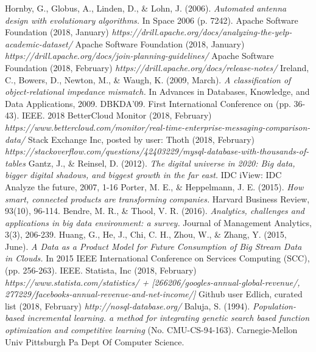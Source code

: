 \documentclass[a4paper,english]{report}
\begin{document}
\begin{thebibliography}{1}
		Hornby, G., Globus, A., Linden, D., \& Lohn, J. (2006). \emph{Automated antenna design with evolutionary algorithms.} In Space 2006 (p. 7242).
		Apache Software Foundation (2018, January) \emph{https://drill.apache.org/docs/analyzing-the-yelp-academic-dataset/}
		Apache Software Foundation (2018, January)
		\emph{https://drill.apache.org/docs/join-planning-guidelines/}
		Apache Software Foundation (2018, February) 	\emph{https://drill.apache.org/docs/release-notes/}
		Ireland, C., Bowers, D., Newton, M., \& Waugh, K. (2009, March). \emph{A classification of object-relational impedance mismatch.} In Advances in Databases, Knowledge, and Data Applications, 2009. DBKDA'09. First International Conference on (pp. 36-43). IEEE.
		2018 BetterCloud Monitor (2018, February)
		\emph{https://www.bettercloud.com/monitor/real-time-enterprise-messaging-comparison-data/}
		Stack Exchange Inc, posted by user: Thoth (2018, February) \emph{https://stackoverflow.com/questions/42403229/mysql-database-with-thousands-of-tables}
		Gantz, J., \& Reinsel, D. (2012). \emph{The digital universe in 2020: Big data, bigger digital shadows, and biggest growth in the far east.} IDC iView: IDC Analyze the future, 2007, 1-16
		Porter, M. E., \& Heppelmann, J. E. (2015). \emph{How smart, connected products are transforming companies.} Harvard Business Review, 93(10), 96-114.
		Bendre, M. R., \& Thool, V. R. (2016). \emph{Analytics, challenges and applications in big data environment: a survey.} Journal of Management Analytics, 3(3), 206-239.
		Huang, G., He, J., Chi, C. H., Zhou, W., \& Zhang, Y. (2015, June). \emph{A Data as a Product Model for Future Consumption of Big Stream Data in	Clouds.} In 2015 IEEE International Conference on Services Computing (SCC), (pp. 256-263). IEEE.
		Statista, Inc (2018, February) \emph{https://www.statista.com/statistics/ + [266206/googles-annual-global-revenue/, 277229/facebooks-annual-revenue-and-net-income/]}
		Github user Edlich, curated list (2018, February) \emph{http://nosql-database.org/}
		Baluja, S. (1994). \emph{Population-based incremental learning. a method for integrating genetic search based function optimization and competitive learning} (No. CMU-CS-94-163). Carnegie-Mellon Univ Pittsburgh Pa Dept Of Computer Science.

\end{thebibliography}
\end{document}
